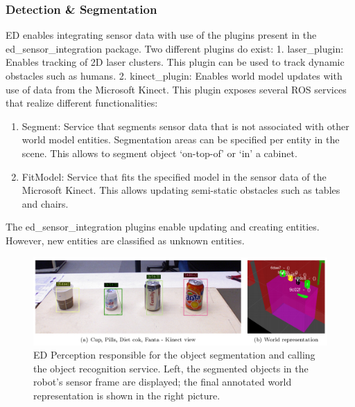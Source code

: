 \subsubsection{Detection \& Segmentation}
ED enables integrating sensor data with use of the plugins present in the ed\_sensor\_integration package. Two different plugins do exist:
1. laser\_plugin: Enables tracking of 2D laser clusters. This plugin can be used to track dynamic obstacles such as humans.
2. kinect\_plugin: Enables world model updates with use of data from the Microsoft Kinect\texttrademark. This plugin exposes several ROS services that realize different functionalities:
\begin{enumerate}[label=(\alph*)]
\item Segment: Service that segments sensor data that is not associated with other world model entities. Segmentation areas can be specified per entity in the scene. This allows to segment object ‘on-top-of’ or ‘in’ a cabinet.
\item FitModel: Service that fits the specified model in the sensor data of the Microsoft Kinect\texttrademark. This allows updating semi-static obstacles such as tables and chairs.
\end{enumerate}


The ed\_sensor\_integration plugins enable updating and creating entities. However, new entities are classified as unknown entities.
\begin{figure}[h]
    \centering
	\includegraphics[width = 1\linewidth]{Figures/ed_perception}
    \caption{ED Perception responsible for the object segmentation and calling the object recognition service. Left, the segmented objects in the robot's sensor frame are displayed; the final annotated world representation is shown in the right picture.}
	\label{fig:ed_perception}
\end{figure} 